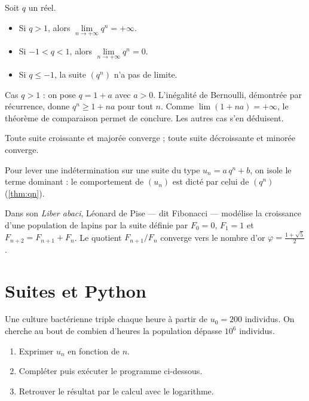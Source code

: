 \begin{theoreme}[Limite de $q^n$]\label{thm:qn}
Soit $q$ un réel.
\begin{itemize}
  \item Si $q > 1$, alors $\lim\limits_{n \to +\infty} q^n = +\infty$.
  \item Si $-1 < q < 1$, alors $\lim\limits_{n \to +\infty} q^n = 0$.
  \item Si $q \leq -1$, la suite $(q^n)$ n'a pas de limite.
\end{itemize}
\end{theoreme}

\begin{demonstration}
Cas $q>1$ : on pose $q = 1 + a$ avec $a > 0$. L'inégalité de
Bernoulli, démontrée par récurrence, donne $q^n \geq 1 + na$ pour
tout $n$. Comme $\lim (1+na) = +\infty$, le théorème de comparaison
permet de conclure. Les autres cas s'en déduisent.
\end{demonstration}

\begin{propriete}
Toute suite croissante et majorée converge ; toute suite décroissante
et minorée converge.
\end{propriete}

\begin{retenir}
Pour lever une indétermination sur une suite du type
$u_n = a\,q^n + b$, on isole le terme dominant : le comportement de
$(u_n)$ est dicté par celui de $(q^n)$ (\cref{thm:qn}).
\end{retenir}

\begin{histoire}
Dans son \emph{Liber abaci}, Léonard de Pise — dit Fibonacci —
modélise la croissance d'une population de lapins par la suite
définie par $F_0 = 0$, $F_1 = 1$ et $F_{n+2} = F_{n+1} + F_n$. Le
quotient $F_{n+1}/F_n$ converge vers le nombre d'or
$\varphi = \frac{1+\sqrt{5}}{2}$.
\end{histoire}

\section{Suites et Python}

\begin{activite}
Une culture bactérienne triple chaque heure à partir de
$u_0 = 200$ individus. On cherche au bout de combien d'heures la
population dépasse $10^6$ individus.
\begin{enumerate}
  \item Exprimer $u_n$ en fonction de $n$.
  \item Compléter puis exécuter le programme ci-dessous.
  \item Retrouver le résultat par le calcul avec le logarithme.
\end{enumerate}
\end{activite}

